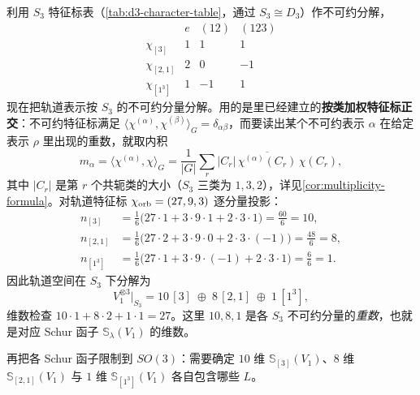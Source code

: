 \begin{example}[{$p^3$ 构型：$S_3$ 约束给出 $^4S,{}^2D,{}^2P$}]
利用 $S_3$ 特征标表（\cref{tab:d3-character-table}，通过 $S_3\cong D_3$）作不可约分解，
\[
\begin{array}{c|ccc}
& e & (12) & (123) \\\hline
\chi_{[3]} & 1 & 1 & 1 \\
\chi_{[2,1]} & 2 & 0 & -1 \\
\chi_{[1^3]} & 1 & -1 & 1
\end{array}
\]
现在把轨道表示按 $S_3$ 的不可约分量分解。用的是里已经建立的\textbf{按类加权特征标正交}：不可约特征标满足 $\langle\chi^{(\alpha)},\chi^{(\beta)}\rangle_G=\delta_{\alpha\beta}$，而要读出某个不可约表示 $\alpha$ 在给定表示 $\rho$ 里出现的重数，就取内积
\[
m_\alpha=\langle\chi^{(\alpha)},\chi\rangle_G
=\frac1{|G|}\sum_r |C_r|\,\overline{\chi^{(\alpha)}(C_r)}\,\chi(C_r),
\]
其中 $|C_r|$ 是第 $r$ 个共轭类的大小（$S_3$ 三类为 $1,3,2$），详见\cref{cor:multiplicity-formula}。对轨道特征标 $\chi_{\rm orb}=(27,9,3)$ 逐分量投影：
\begin{align*}
n_{[3]}&=\frac1{6}\bigl(27\cdot1+3\cdot9\cdot1+2\cdot3\cdot1\bigr)=\frac{60}{6}=10,\\
n_{[2,1]}&=\frac1{6}\bigl(27\cdot2+3\cdot9\cdot0+2\cdot3\cdot(-1)\bigr)=\frac{48}{6}=8,\\
n_{[1^3]}&=\frac1{6}\bigl(27\cdot1+3\cdot9\cdot(-1)+2\cdot3\cdot1\bigr)=\frac{6}{6}=1.
\end{align*}
因此轨道空间在 $S_3$ 下分解为
\begin{equation}
V_1^{\otimes3}\big|_{S_3}
=10\,[3]\;\oplus\;8\,[2,1]\;\oplus\;1\,[1^3],
\label{eq:p3-orbital-s3-decomp}
\end{equation}
维数检查 $10\cdot1+8\cdot2+1\cdot1=27$。这里 $10,8,1$ 是各 $S_3$ 不可约分量的\emph{重数}，也就是对应 Schur 函子 $\mathbb{S}_\lambda(V_1)$ 的维数。

再把各 Schur 函子限制到 $SO(3)$：需要确定 $10$ 维
$\mathbb{S}_{[3]}(V_1)$、$8$ 维 $\mathbb{S}_{[2,1]}(V_1)$ 与 $1$ 维
$\mathbb{S}_{[1^3]}(V_1)$ 各自包含哪些 $L$。


\end{example}
